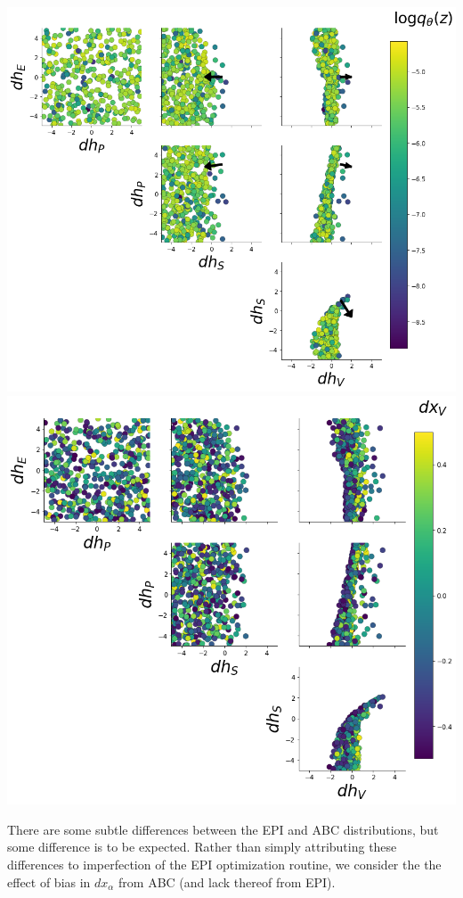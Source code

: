 \documentclass[11pt]{article}
\begin{document}
\begin{center}
\includegraphics[scale=0.25]{figs/V1_drdh_EPI_V.png} 
\includegraphics[scale=0.25]{figs/V1_drdh_ABC_V.png} \\
\end{center}

There are some subtle differences between the EPI and ABC distributions, but some difference is to be expected.
Rather than simply attributing these differences to imperfection of the EPI optimization routine, we consider the the effect of bias in $dx_\alpha$ from ABC (and lack thereof from EPI).
\end{document}

